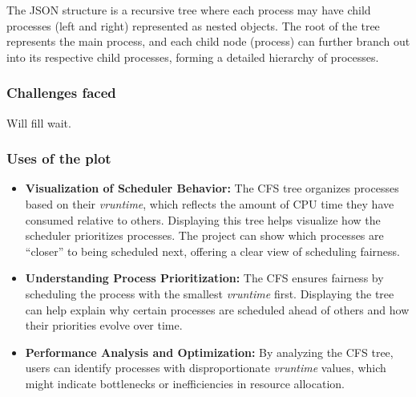 \documentclass[12pt]{article}
\begin{document}
The JSON structure is a recursive tree where each process may have child processes (left and right) represented as nested objects. The root of the tree represents the main process, and each child node (process) can further branch out into its respective child processes, forming a detailed hierarchy of processes.

\subsubsection{Challenges faced}
Will fill wait.
\subsubsection{Uses of the plot}

\begin{itemize}
    \item \textbf{Visualization of Scheduler Behavior:} 
    The CFS tree organizes processes based on their \textit{vruntime}, which reflects the amount of CPU time they have consumed relative to others. Displaying this tree helps visualize how the scheduler prioritizes processes. The project can show which processes are ``closer'' to being scheduled next, offering a clear view of scheduling fairness.

    \item \textbf{Understanding Process Prioritization:} 
    The CFS ensures fairness by scheduling the process with the smallest \textit{vruntime} first. Displaying the tree can help explain why certain processes are scheduled ahead of others and how their priorities evolve over time.

    \item \textbf{Performance Analysis and Optimization:} 
    By analyzing the CFS tree, users can identify processes with disproportionate \textit{vruntime} values, which might indicate bottlenecks or inefficiencies in resource allocation.
\end{itemize}
\end{document}
